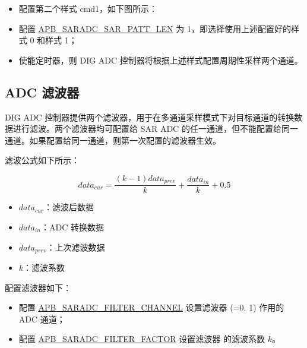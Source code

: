 \documentclass[main\_\_CN.tex]{subfiles}
\begin{document}
\begin{itemize}
    \item 配置第二个样式 cmd1，如下图所示：

\centering
{}%
%
%
\reglabel{}\regnewline%
\begin{regdesc}\end{regdesc}
\end{itemize}

\begin{itemize}
    \item 配置 \hyperref[fielddesc:APBSARADCSARPATTLEN]{APB\_SARADC\_SAR\_PATT\_LEN} 为 1，即选择使用上述配置好的样式 0 和样式 1；
    \item 使能定时器，则 DIG ADC 控制器将根据上述样式配置周期性采样两个通道。
\end{itemize}


\subsection{ADC 滤波器}\label{sec:adc_filter}
DIG ADC 控制器提供两个滤波器，用于在多通道采样模式下对目标通道的转换数据进行滤波。两个滤波器均可配置给 SAR ADC 的任一通道，但不能配置给同一通道。如果配置给同一通道，则第一次配置的滤波器生效。

滤波公式如下所示：

\[data_{cur} = \frac{(k-1)data_{prev}}{k}+\frac{data_{in}}{k}+0.5\]

\begin{itemize}
    \item \(data_{cur}\)：滤波后数据
    \item \(data_{in}\)：ADC 转换数据
    \item \(data_{prev}\)：上次滤波数据
    \item \(k\)：滤波系数
\end{itemize}

配置滤波器如下：
\begin{itemize}
\item 配置 \hyperref[fielddesc:APBSARADCFILTERCHANNEL1]{APB\_SARADC\_FILTER\_CHANNEL}  设置滤波器  (=0, 1) 作用的 ADC 通道；
\item 配置 \hyperref[fielddesc:APBSARADCFILTERFACTOR1]{APB\_SARADC\_FILTER\_FACTOR} 设置滤波器  的滤波系数 \(k\)。
\end{itemize}
\end{document}
